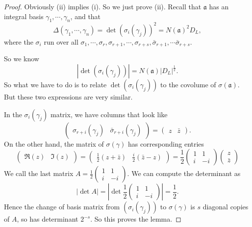 \documentclass[a4paper]{article}
\begin{document}
\begin{proof}
  Obviously (ii) implies (i). So we just prove (ii). Recall that $\mathfrak{a}$ has an integral basis $\gamma_1, \cdots, \gamma_n$, and that
  \[
    \Delta(\gamma_1, \cdots, \gamma_n) = \det (\sigma_i(\gamma_j))^2 = N(\mathfrak{a})^2 D_L,
  \]
  where the $\sigma_i$ run over all $\sigma_1, \cdots, \sigma_r, \sigma_{r + 1}, \cdots, \sigma_{r + s}, \bar{\sigma}_{r + 1}, \cdots \bar{\sigma}_{r + s}$.

  So we know
  \[
    |\det (\sigma_i(\gamma_j))| = N(\mathfrak{a}) |D_L|^{\frac{1}{2}}.
  \]
  So what we have to do is to relate $\det(\sigma_i(\gamma_j))$ to the covolume of $\sigma(\mathfrak{a})$. But these two expressions are very similar.

  In the $\sigma_i (\gamma_j)$ matrix, we have columns that look like
  \[
    \begin{pmatrix}
      \sigma_{r + i}(\gamma_j) & \bar{\sigma}_{r + i}(\gamma_j)
    \end{pmatrix} =
    \begin{pmatrix}
      z & \bar{z}
    \end{pmatrix}.
  \]
  On the other hand, the matrix of $\sigma(\gamma)$ has corresponding entries
  \[
    \begin{pmatrix}
      \Re(z) & \Im(z)
    \end{pmatrix} =
    \begin{pmatrix}
      \frac{1}{2}(z + \bar{z}) &\frac{i}{2}(\bar{z} - z)
    \end{pmatrix} =
    \frac{1}{2}
    \begin{pmatrix}
      1 & 1\\
      i & -i
    \end{pmatrix}
    \begin{pmatrix}
      z\\\bar{z}
    \end{pmatrix}
  \]
  We call the last matrix $A = \displaystyle\frac{1}{2}\begin{pmatrix}1 & 1\\i & -i\end{pmatrix}$. We can compute the determinant as
  \[
    |\det A| = \left|\det \frac{1}{2}
    \begin{pmatrix}
      1 & 1\\
      i & -i
    \end{pmatrix}\right| = \frac{1}{2}.
  \]
  Hence the change of basis matrix from $(\sigma_i(\gamma_j))$ to $\sigma(\gamma)$ is $s$ diagonal copies of $A$, so has determinant $2^{-s}$. So this proves the lemma.
\end{proof}
\end{document}
